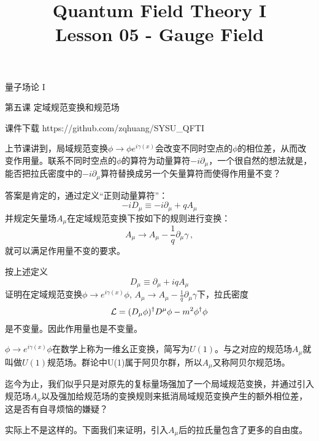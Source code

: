 \documentclass[CJK]{beamer}
\title{Quantum Field Theory I \\ Lesson 05 - Gauge Field}
\author{}
\date{}
\begin{document}
\begin{frame}
 
\begin{center}
\begin{Large}
\bch
量子场论 I 

{\vskip 0.3in}

第五课 定域规范变换和规范场

\ech
\end{Large}
\end{center}

\vskip 0.2in

\bch
课件下载
\ech
https://github.com/zqhuang/SYSU\_QFTI

\end{frame}



\begin{frame}
\bch
上节课讲到，局域规范变换$\phi \rightarrow \phi e^{i\gamma(x)}$会改变不同时空点的$\phi$的相位差，从而改变作用量。联系不同时空点的$\phi$的算符为动量算符$-i\partial_\mu$，一个很自然的想法就是，能否把拉氏密度中的$-i\partial_\mu$算符替换成另一个矢量算符而使得作用量不变？

\skipline
答案是肯定的，通过定义“正则动量算符”：
$$-iD_\mu \equiv -i\partial_\mu + q A_\mu$$
并规定矢量场$A_\mu$在定域规范变换下按如下的规则进行变换：
$$ A_\mu \rightarrow A_\mu - \frac{1}{q} \partial_\mu \gamma\, ,$$
就可以满足作用量不变的要求。

\ech
\end{frame}

\begin{frame}
\bch
按上述定义
$$D_\mu \equiv \partial_\mu + iq A_\mu$$
证明在定域规范变换$\phi \rightarrow e^{i\gamma(x)}\phi$, $A_\mu \rightarrow A_\mu - \frac{1}{q}\partial_\mu\gamma$下，拉氏密度
$${\mathcal{L}} = (D_\mu\phi)^\dagger D^\mu\phi - m^2\phi^\dagger \phi$$
是不变量。因此作用量也是不变量。

\skipline
$\phi \rightarrow e^{i\gamma(x)}\phi$在数学上称为一维幺正变换，简写为$U(1)$。与之对应的规范场$A_\mu$就叫做$U(1)$规范场。群论中U(1)属于阿贝尔群，所以$A_\mu$又称阿贝尔规范场。
\ech
\end{frame}

\begin{frame}
\bch

迄今为止，我们似乎只是对原先的复标量场强加了一个局域规范变换，并通过引入规范场$A_\mu$以及强加给规范场的变换规则来抵消局域规范变换产生的额外相位差，这是否有自寻烦恼的嫌疑？

\skipline
实际上不是这样的。下面我们来证明，引入$A_\mu$后的拉氏量包含了更多的自由度。

\ech
\end{frame}
\end{document}
